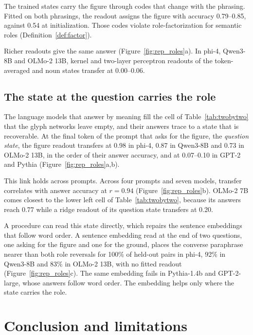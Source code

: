 \documentclass[10pt]{article}
\theoremstyle{plain}
\theoremstyle{remark}
\begin{document}
The trained states carry the figure through codes that change with the phrasing. Fitted on both phrasings, the readout assigns the figure with accuracy 0.79--0.85, against 0.54 at initialization. Those codes violate role-factorization for semantic roles (Definition~\ref{def:factor}).

Richer readouts give the same answer (Figure~\ref{fig:rep_roles}a). In phi-4, Qwen3-8B and OLMo-2 13B, kernel and two-layer perceptron readouts of the token-averaged and noun states transfer at 0.00--0.06.

\subsection{The state at the question carries the role}
\label{sec:behavior}

The language models that answer by meaning fill the cell of Table~\ref{tab:twobytwo} that the glyph networks leave empty, and their answers trace to a state that is recoverable. At the final token of the prompt that asks for the figure, the \emph{question state}, the figure readout transfers at 0.98 in phi-4, 0.87 in Qwen3-8B and 0.73 in OLMo-2 13B, in the order of their answer accuracy, and at 0.07--0.10 in GPT-2 and Pythia (Figure~\ref{fig:rep_roles}a,b).

This link holds across prompts. Across four prompts and seven models, transfer correlates with answer accuracy at $r = 0.94$ (Figure~\ref{fig:rep_roles}b). OLMo-2 7B comes closest to the lower left cell of Table~\ref{tab:twobytwo}, because its answers reach 0.77 while a ridge readout of its question state transfers at 0.20.

A procedure can read this state directly, which repairs the sentence embeddings that follow word order. A sentence embedding read at the end of two questions, one asking for the figure and one for the ground, places the converse paraphrase nearer than both role reversals for 100\% of held-out pairs in phi-4, 92\% in Qwen3-8B and 83\% in OLMo-2 13B, with no fitted readout (Figure~\ref{fig:rep_roles}c). The same embedding fails in Pythia-1.4b and GPT-2-large, whose answers follow word order. The embedding helps only where the state carries the role.

\section{Conclusion and limitations}
\label{sec:discussion}
\end{document}
